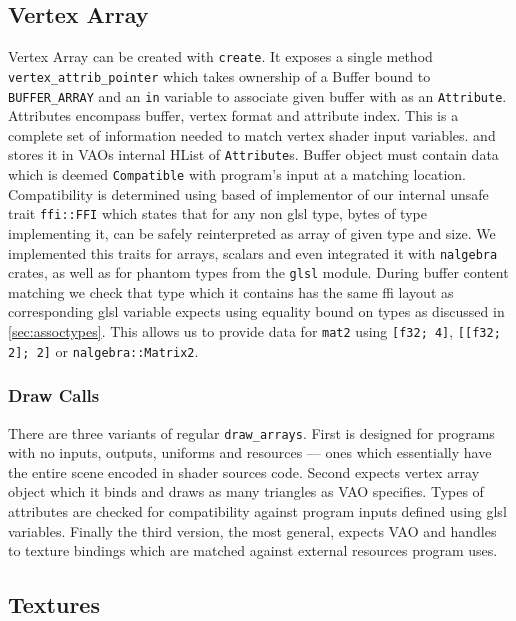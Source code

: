 \subsection{Vertex Array}

Vertex Array can be created with \texttt{create}. It exposes a single method \texttt{vertex\_attrib\_pointer} which takes ownership of a Buffer bound to \texttt{BUFFER\_ARRAY}
and an \texttt{in} variable to associate given buffer with as an \texttt{Attribute}.
Attributes encompass buffer, vertex format and attribute index. This is a complete set of information needed to match vertex shader input variables.
and stores it in VAOs internal HList of \texttt{Attribute}s. 
Buffer object must contain data which is deemed \texttt{Compatible} with program's input at a matching location.
Compatibility is determined using based of implementor of our internal unsafe trait \texttt{ffi::FFI} which states that for any non glsl type, bytes of type implementing it,
can be safely reinterpreted as array of given type and size. 
We implemented this traits for arrays, scalars and even integrated it with \texttt{nalgebra} crates,
as well as for phantom types from the \texttt{glsl} module.
During buffer content matching we check that type which it contains has the same ffi layout as corresponding glsl variable expects using equality bound on types as discussed in \ref{sec:assoctypes}.
This allows us to provide data for \texttt{mat2} using \texttt{[f32; 4]}, \texttt{[[f32; 2]; 2]} or \texttt{nalgebra::Matrix2}.

\subsubsection{Draw Calls}

There are three variants of regular \texttt{draw\_arrays}. First is designed for programs with no inputs, outputs, uniforms and resources --- ones which essentially have the entire scene
encoded in shader sources code. 
Second expects vertex array object which it binds and draws as many triangles as VAO specifies. Types of attributes are checked for compatibility against program inputs defined using glsl variables.
Finally the third version, the most general, expects VAO and handles to texture bindings which are matched against external resources program uses. 

\subsection{Textures}

